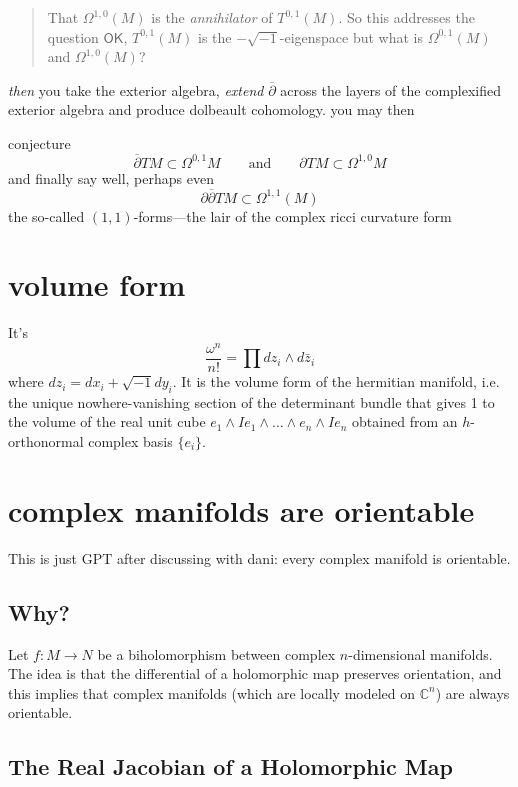 \begin{quotation}
That \(\Omega^{1,0}(M)\) is the \textit{annihilator} of \(T^{0,1}(M)\). So this addresses the question $\mathsf{OK}$, \(T^{0,1}(M)\) is the \(- \sqrt{-1}\)-eigenspace but what is \(\Omega^{0,1}(M)\) and \(\Omega^{1,0}(M)\)?
\end{quotation}
\textit{then} you take the exterior algebra, \textit{extend} \(\overline{\partial}\) across the layers of the complexified exterior algebra and produce dolbeault cohomology. you may then
\begin{thing6}{conjecture}\leavevmode
	\[\overline{\partial}TM \subset \Omega^{0,1}M \qquad \text{and}\qquad  \partial TM \subset \Omega^{1,0}M\]
and finally say well, perhaps even
\[\partial\overline{\partial}TM \subset \Omega^{1,1}(M)\]
the so-called \((1,1)\)-forms---the lair of the complex ricci curvature form
\end{thing6}
\section{volume form}
It's
\[\frac{\omega^n}{n!}=\prod dz_i \wedge d\bar{z}_i\]
where \(dz_i=dx_i + \sqrt{-1}dy_i\). It is the volume form of the hermitian manifold, i.e. the unique nowhere-vanishing section of the determinant bundle that gives 1 to the volume of the real unit cube \(e_1 \wedge Ie_1\wedge\ldots\wedge e_n \wedge I e_n\) obtained from an \(h\)-orthonormal complex basis \(\{e_i\}\).

\section{complex manifolds are orientable}

This is just GPT after discussing with dani: every complex manifold is orientable.

\subsection*{Why?}

Let \( f: M \to N \) be a biholomorphism between complex \(n\)-dimensional manifolds. The idea is that the differential of a holomorphic map preserves orientation, and this implies that complex manifolds (which are locally modeled on \(\mathbb{C}^n\)) are always orientable.

\subsection*{The Real Jacobian of a Holomorphic Map}


